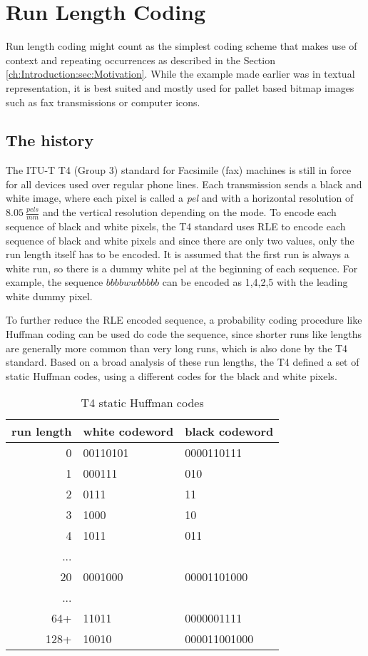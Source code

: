 \section{Run Length Coding}
\label{ch:Principles of compression:sec:Run Length Encoding}
\par{
	Run length coding might count as the simplest coding scheme that makes use of context and repeating occurrences as described in the Section \ref{ch:Introduction:sec:Motivation}. While the example made earlier was in textual representation, it is best suited and mostly used for pallet based bitmap images \cite{palette-image} such as fax transmissions or computer icons.
}

\subsection{The history}
\label{ch:Principles of compression:sec:Run Length Encoding:subSec:History}
\par{
 The ITU-T T4 (Group 3) standard for Facsimile (fax) machines \cite{ITU} is still in force for all devices used over regular phone lines. Each transmission sends a black and white image, where each pixel is called a \textit{pel} and with a horizontal resolution of $8.05 \: \frac{pels}{mm}$ and the vertical resolution depending on the mode. To encode each sequence of black and white pixels, the T4 standard uses RLE to encode each sequence of black and white pixels and since there are only two values, only the run length itself has to be encoded. It is assumed that the first run is always a white run, so there is a dummy white pel at the beginning of each sequence. For example, the sequence $bbbbwwbbbbb$ can be encoded as 1,4,2,5 with the leading white dummy pixel.
}
	
\par{
To further reduce the RLE encoded sequence, a probability coding procedure like Huffman coding can be used do code the sequence, since shorter runs like lengths are generally more common than very long runs, which is also done by the T4 standard. Based on a broad analysis of these run lengths, the T4 defined a set of static Huffman codes, using a different codes for the black and white pixels.
}
\begin{table}
	\centering
	\begin{tabular}[p]{r|l|l}
		run length &  white codeword & black codeword\\
		\hline
		0 &  00110101 & 0000110111\\
		1 & 000111 & 010\\
		2 & 0111 & 11\\
		3 & 1000 & 10\\
		4 & 1011 & 011\\
		... &  & \\
		20 & 0001000 & 00001101000\\
		... & & \\
		64+ & 11011 & 0000001111\\
		128+ & 10010 & 000011001000
		\label{tab:t4 run length Huffman codes}
	\end{tabular}
	\caption{T4 static Huffman codes}
\end{table}

